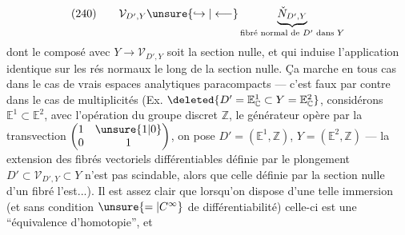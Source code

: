 \[
(240)\qquad\mathcal V_{D',Y}\unsure{\hookrightarrow|\longleftarrow}\underbrace{\check N_{D',Y}}_{\text{fibré normal de }D'\text{ dans }Y}
\]
 dont le composé avec $Y\longrightarrow\mathcal V_{D',Y}$ soit la section nulle, et qui induise l'application identique sur les rés normaux le long de la section nulle. Ça  marche en tous cas dans le cas de vrais espaces analytiques paracompacts --- c'est faux par contre dans le cas de multiplicités (Ex. $\deleted{D'=\mathbb E^1_{\mathbb C}\subset Y=\mathbb E^2_{\mathbb C}}$, considérons $\mathbb E^1\subset\mathbb E^2$, avec l'opération du groupe discret $\mathbb Z$,  le générateur opère par la transvection $\begin{pmatrix}1&\unsure{1|0}\\0&1\end{pmatrix}$, on pose $D'=(\mathbb E^1,\mathbb Z)$, $Y=(\mathbb E^2,\mathbb Z)$ --- la  extension des fibrés vectoriels différentiables définie par le plongement $D'\subset\mathcal V_{D',Y}\subset Y$ n'est pas scindable, alors que celle définie par la section nulle d'un fibré l'est...). Il est assez clair que lorsqu'on dispose d'une telle immersion (et sans condition $\unsure{=|C^{\infty}}$ de différentiabilité) celle-ci est une ``équivalence d'homotopie'', et
